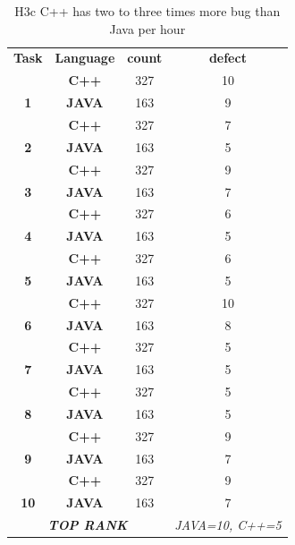 \documentclass[sigconf,review]{acmart}
\begin{document}
\begin{table}
\scriptsize
\centering
\caption{H3c C++ has two to three times more bug than Java per hour}
\label{tab:h3c}
\begin{tabular}{cccc}
\textbf{Task} & \textbf{Language} & \textbf{count} & \textbf{defect} \\
 & \textbf{C++} & 327 & \cellcolor[HTML]{C0C0C0}10 \\
\multirow{-2}{*}{\textbf{1}} & \textbf{JAVA} & 163 & \cellcolor[HTML]{C0C0C0}9 \\
 & \textbf{C++} & 327 & 7 \\
\multirow{-2}{*}{\textbf{2}} & \textbf{JAVA} & 163 & \cellcolor[HTML]{C0C0C0}5 \\
 & \textbf{C++} & 327 & 9 \\
\multirow{-2}{*}{\textbf{3}} & \textbf{JAVA} & 163 & \cellcolor[HTML]{C0C0C0}7 \\
 & \textbf{C++} & 327 & \cellcolor[HTML]{C0C0C0}6 \\
\multirow{-2}{*}{\textbf{4}} & \textbf{JAVA} & 163 & \cellcolor[HTML]{C0C0C0}5 \\
 & \textbf{C++} & 327 & 6 \\
\multirow{-2}{*}{\textbf{5}} & \textbf{JAVA} & 163 & \cellcolor[HTML]{C0C0C0}5 \\
 & \textbf{C++} & 327 & \cellcolor[HTML]{C0C0C0}10 \\
\multirow{-2}{*}{\textbf{6}} & \textbf{JAVA} & 163 & \cellcolor[HTML]{C0C0C0}8 \\
 & \textbf{C++} & 327 & \cellcolor[HTML]{C0C0C0}5 \\
\multirow{-2}{*}{\textbf{7}} & \textbf{JAVA} & 163 & \cellcolor[HTML]{C0C0C0}5 \\
 & \textbf{C++} & 327 & \cellcolor[HTML]{C0C0C0}5 \\
\multirow{-2}{*}{\textbf{8}} & \textbf{JAVA} & 163 & \cellcolor[HTML]{C0C0C0}5 \\
 & \textbf{C++} & 327 & 9 \\
\multirow{-2}{*}{\textbf{9}} & \textbf{JAVA} & 163 & \cellcolor[HTML]{C0C0C0}7 \\
 & \textbf{C++} & 327 & 9 \\
\multirow{-2}{*}{\textbf{10}} & \textbf{JAVA} & 163 & \cellcolor[HTML]{C0C0C0}7 \\
\multicolumn{3}{c}{\textit{\textbf{TOP RANK}}} & \textit{JAVA=10, C++=5}
\end{tabular}
\end{table}
\end{document}
